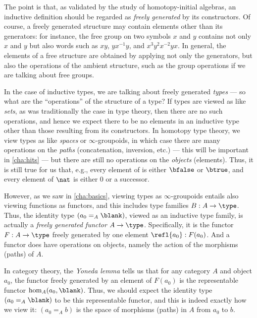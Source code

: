 %
%
The point is that, as validated by the study of homotopy-initial algebras, an inductive definition should be regarded as \emph{freely generated} by its constructors.
Of course, a freely generated structure may contain elements other than its generators: for instance, the free group on two symbols $x$ and $y$ contains not only $x$ and $y$ but also words such as $xy$, $yx^{-1}y$, and $x^3y^2x^{-2}yx$.
In general, the elements of a free structure are obtained by applying not only the generators, but also the operations of the ambient structure, such as the group operations if we are talking about free groups.

In the case of inductive types, we are talking about freely generated \emph{types} --- so what are the ``operations'' of the structure of a type?
If types are viewed as like \emph{sets}, as was traditionally the case in type theory, then there are no such operations, and hence we expect there to be no elements in an inductive type other than those resulting from its constructors.
In homotopy type theory, we view types as like \emph{spaces} or $\infty$-groupoids,%
in which case there are many operations on the \emph{paths} (concatenation, inversion, etc.) --- this will be important in \cref{cha:hits} --- but there are still no operations on the \emph{objects} (elements).
Thus, it is still true for us that, e.g., every element of \bool is either $\bfalse$ or $\btrue$, and every element of $\nat$ is either $0$ or a successor.

However, as we saw in \cref{cha:basics}, viewing types as $\infty$-groupoids entails also viewing functions as functors, and this includes type families $B:A\to\type$.
Thus, the identity type $(a_0 =_A \blank)$, viewed as an inductive type family, is actually a \emph{freely generated functor} $A\to\type$.
Specifically, it is the functor $F:A\to\type$ freely generated by one element $\refl{a_0}: F(a_0)$.
And a functor does have operations on objects, namely the action of the morphisms (paths) of $A$.

In category theory, the \emph{Yoneda lemma} tells us that for any category $A$ and object $a_0$, the functor freely generated by an element of $F(a_0)$ is the representable functor $\hom_A(a_0,\blank)$.
Thus, we should expect the identity type $(a_0 =_A \blank)$ to be this representable functor, and this is indeed exactly how we view it: $(a_0 =_A b)$ is the space of morphisms (paths) in $A$ from $a_0$ to $b$.


